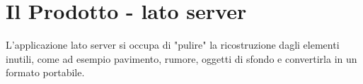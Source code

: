 



\section{Il Prodotto - lato server}
L'applicazione lato server si occupa di "pulire" la ricostruzione dagli elementi inutili, come ad esempio pavimento, rumore, oggetti di sfondo e convertirla in un formato portabile.\\
